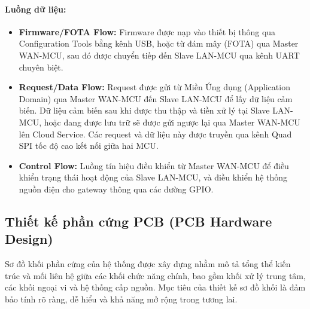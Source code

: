         \paragraph{Luồng dữ liệu:}\par
            \begin{itemize}
                \item \textbf{Firmware/FOTA Flow:} Firmware được nạp vào thiết bị thông qua Configuration Tools bằng kênh USB, hoặc từ đám mây (FOTA) qua Master WAN-MCU, sau đó được chuyển tiếp đến Slave LAN-MCU qua kênh UART chuyên biệt.
                \item \textbf{Request/Data Flow:} Request được gửi từ Miền Ứng dụng (Application Domain) qua Master WAN-MCU đến Slave LAN-MCU để lấy dữ liệu cảm biến. Dữ liệu cảm biến sau khi được thu thập và tiền xử lý tại Slave LAN-MCU, hoặc đang được lưu trữ sẽ được gửi ngược lại qua Master WAN-MCU lên Cloud Service. Các request và dữ liệu này được truyền qua kênh Quad SPI tốc độ cao kết nối giữa hai MCU.
                \item \textbf{Control Flow:} Luồng tín hiệu điều khiển từ Master WAN-MCU để điều khiển trạng thái hoạt động của Slave LAN-MCU, và điều khiển hệ thống nguồn điện cho gateway thông qua các đường GPIO.
            \end{itemize}

    
    \subsection{Thiết kế phần cứng PCB (PCB Hardware Design)}
        Sơ đồ khối phần cứng của hệ thống được xây dựng nhằm mô tả tổng thể kiến trúc và mối liên hệ giữa các khối chức năng chính, bao gồm khối xử lý trung tâm, các khối ngoại vi và hệ thống cấp nguồn. Mục tiêu của thiết kế sơ đồ khối là đảm bảo tính rõ ràng, dễ hiểu và khả năng mở rộng trong tương lai.

